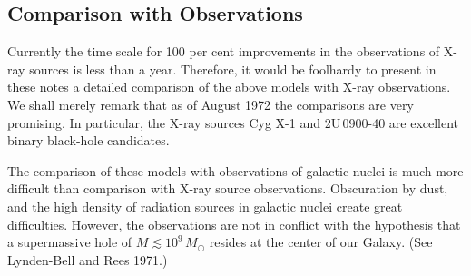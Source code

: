 \subsection{Comparison with Observations}
\label{sec:5.14}

Currently the time scale for 100 per cent improvements in the observations of
X-ray sources is less than a year. Therefore, it would be foolhardy to present in
these notes a detailed comparison of the above models with X-ray observations.
We shall merely remark that as of August 1972 the comparisons are very
promising. In particular, the X-ray sources Cyg X-1 and 2U\,0900-40 are excellent
binary black-hole candidates.

The comparison of these models with observations of galactic nuclei is much
more difficult than comparison with X-ray source observations. Obscuration by
dust, and the high density of radiation sources in galactic nuclei create great
difficulties. However, the observations are not in conflict with the hypothesis
that a supermassive hole of $M \lesssim 10^9\,M_\odot$ resides at the center of our Galaxy. (See
Lynden-Bell and Rees 1971.) \cite{LyndenBellRees1971}
